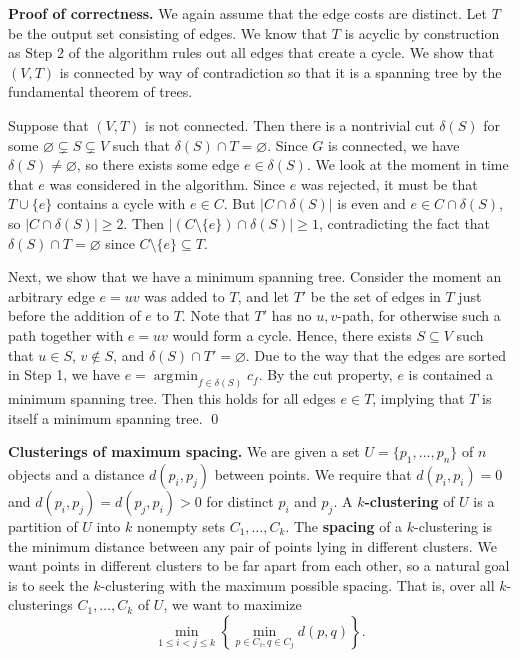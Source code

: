 \documentclass{article}
\DeclareMathOperator*{\argmin}{\arg\!\min}
\begin{document}
{\color{blue} 
{\bf Proof of correctness.} We again assume that the edge costs 
are distinct. Let $T$ be the output set consisting of edges. 
We know that $T$ is acyclic by construction as Step 2 of the algorithm 
rules out all edges that create a cycle. We show that $(V, T)$ is 
connected by way of contradiction so that it is a spanning tree 
by the fundamental theorem of trees. 

Suppose that $(V, T)$ is not connected. Then there is a nontrivial cut 
$\delta(S)$ for some $\varnothing \subsetneq S \subsetneq V$ 
such that $\delta(S) \cap T = \varnothing$. Since $G$ is connected, 
we have $\delta(S) \neq \varnothing$, so there exists some edge $e \in \delta(S)$. 
We look at the moment in time that $e$ was considered in the algorithm. 
Since $e$ was rejected, it must be that $T \cup \{e\}$ contains a cycle with 
$e \in C$. But $|C \cap \delta(S)|$ is even and $e \in C \cap \delta(S)$, so 
$|C \cap \delta(S)| \geq 2$. Then $|(C \setminus \{e\}) \cap \delta(S)| \geq 1$, 
contradicting the fact that $\delta(S) \cap T = \varnothing$ 
since $C \setminus \{e\} \subseteq T$. 

Next, we show that we have a minimum spanning tree. Consider the moment 
an arbitrary edge $e = uv$ was added to $T$, and let $T'$ be the 
set of edges in $T$ just before the addition of $e$ to $T$. Note that 
$T'$ has no $u, v$-path, for otherwise such a path together with $e = uv$ 
would form a cycle. Hence, there exists $S \subseteq V$ such that 
$u \in S$, $v \notin S$, and $\delta(S) \cap T' = \varnothing$. Due 
to the way that the edges are sorted in Step 1, we have 
$e = \argmin_{f\in\delta(S)} c_f$. By the cut property, $e$ is 
contained a minimum spanning tree. Then this holds for all edges $e \in T$, 
implying that $T$ is itself a minimum spanning tree. \qed 
}

{\bf Clusterings of maximum spacing.} We are given a set $U = \{p_1, \dots, p_n\}$
of $n$ objects and a distance $d(p_i, p_j)$ between points. 
We require that $d(p_i, p_i) = 0$ and $d(p_i, p_j) = d(p_j, p_i) > 0$ 
for distinct $p_i$ and $p_j$. A {\bf $k$-clustering} of $U$ is a 
partition of $U$ into $k$ nonempty sets $C_1, \dots, C_k$. 
The {\bf spacing} of a $k$-clustering is the minimum distance 
between any pair of points lying in different clusters. We want 
points in different clusters to be far apart from each other, 
so a natural goal is to seek the $k$-clustering 
with the maximum possible spacing. That is, over all 
$k$-clusterings $C_1, \dots, C_k$ of $U$, we want to maximize 
\[ \min_{1\leq i < j\leq k} \left\{ \min_{p\in C_i, q\in C_j} d(p, q) \right\}. \]
\end{document}

